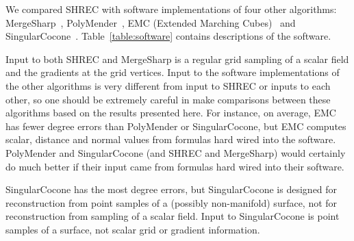 We compared SHREC with software implementations of four other algorithms:
MergeSharp~\cite{bw-cisec-13,bw-erm-13}, 
PolyMender~\cite{j-rrpm-04}, 
EMC (Extended Marching Cubes)~\cite{kbsh-fssev-01} 
and SingularCocone~\cite{Dey2012}.
Table~\ref{table:software} contains descriptions of the software.

Input to both SHREC and MergeSharp is a regular grid sampling
of a scalar field and the gradients at the grid vertices.
Input to the software implementations of the other algorithms
is very different from input to SHREC or inputs to each other,
so one should be extremely careful in make comparisons
between these algorithms based on the results presented here.
For instance, on average,
EMC has fewer degree errors
than PolyMender or SingularCocone,
but EMC computes scalar, 
distance and normal values from formulas hard wired into the software.
PolyMender and SingularCocone (and SHREC and MergeSharp)
would certainly do much better if their input came
from formulas hard wired into their software.

SingularCocone has the most degree errors,
but SingularCocone is designed for reconstruction 
from point samples of a (possibly non-manifold) surface,
not for reconstruction from sampling of a scalar field.
Input to SingularCocone is point samples of a surface,
not scalar grid or gradient information.


